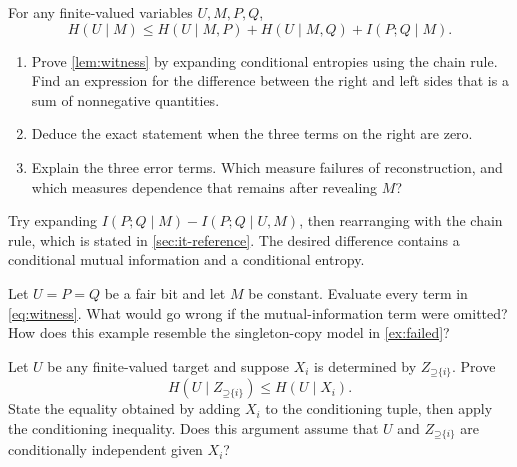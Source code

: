 \documentclass[11pt]{article}
\newcommand{\Up}{\mathord{\supseteq}}
\begin{document}
\begin{lemma}
\label{lem:witness}
For any finite-valued variables $U,M,P,Q$,
\begin{equation}
 H(U\mid M)\le H(U\mid M,P)+H(U\mid M,Q)+I(P;Q\mid M).
 \label{eq:witness}
\end{equation}
\end{lemma}

\begin{exercise}
\label{ex:witness}\important
\begin{enumerate}
\item Prove \cref{lem:witness} by expanding conditional entropies using the
chain rule. Find an expression for the difference between the right and left
sides that is a sum of nonnegative quantities.
\item Deduce the exact statement when the three terms on the right are zero.
\item Explain the three error terms. Which measure failures of reconstruction,
and which measures dependence that remains after revealing $M$?
\end{enumerate}
\end{exercise}
\begin{hint}
Try expanding $I(P;Q\mid M)-I(P;Q\mid U,M)$, then rearranging with the
chain rule, which is stated in
\cref{sec:it-reference}.
The desired difference contains a conditional mutual information
and a conditional entropy.
\end{hint}

\begin{exercise}
\label{ex:dependence}
Let $U=P=Q$ be a fair bit and let $M$ be constant. Evaluate every term in
\eqref{eq:witness}. What would go wrong if the mutual-information term were
omitted? How does this example resemble the singleton-copy model in \cref{ex:failed}?
\end{exercise}

\begin{exercise}
\label{ex:transfer}\important
Let $U$ be any finite-valued target and suppose $X_i$ is determined by
$Z_{\Up\{i\}}$. Prove
\[
 H(U\mid Z_{\Up\{i\}})\le H(U\mid X_i).
\]
State the equality obtained by adding $X_i$ to the conditioning tuple, then
apply the conditioning inequality. Does this argument assume that $U$ and
$Z_{\Up\{i\}}$ are conditionally independent given $X_i$?
\end{exercise}
\end{document}
